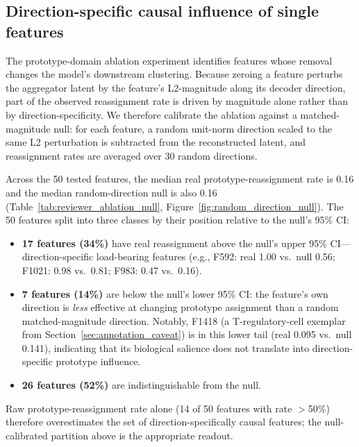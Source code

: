 \documentclass[11pt]{article}
\begin{document}
\subsection{Direction-specific causal influence of single features}
\label{sec:proto_ablation}

The prototype-domain ablation experiment identifies features whose
removal changes the model's downstream clustering. Because zeroing a
feature perturbs the aggregator latent by the feature's L2-magnitude
along its decoder direction, part of the observed reassignment rate is
driven by magnitude alone rather than by direction-specificity. We
therefore calibrate the ablation against a matched-magnitude null: for
each feature, a random unit-norm direction scaled to the same L2
perturbation is subtracted from the reconstructed latent, and
reassignment rates are averaged over 30 random directions.

Across the 50 tested features, the median real prototype-reassignment
rate is 0.16 and the median random-direction null is also 0.16
(Table~\ref{tab:reviewer_ablation_null},
Figure~\ref{fig:random_direction_null}). The 50 features split into
three classes by their position relative to the null's 95\% CI:
\begin{itemize}
\item \textbf{17 features (34\%)} have real reassignment above the
      null's upper 95\% CI---direction-specific load-bearing features
      (e.g., F592: real 1.00 vs.\ null 0.56; F1021: 0.98 vs.\ 0.81;
      F983: 0.47 vs.\ 0.16).
\item \textbf{7 features (14\%)} are below the null's lower 95\% CI:
      the feature's own direction is \emph{less} effective at
      changing prototype assignment than a random matched-magnitude
      direction. Notably, F1418 (a T-regulatory-cell exemplar from
      Section~\ref{sec:annotation_caveat}) is in this lower tail
      (real 0.095 vs.\ null 0.141), indicating that its biological
      salience does not translate into direction-specific prototype
      influence.
\item \textbf{26 features (52\%)} are indistinguishable from the null.
\end{itemize}

Raw prototype-reassignment rate alone (14 of 50 features with rate
$>$50\%) therefore overestimates the set of direction-specifically
causal features; the null-calibrated partition above is the
appropriate readout.
\end{document}
